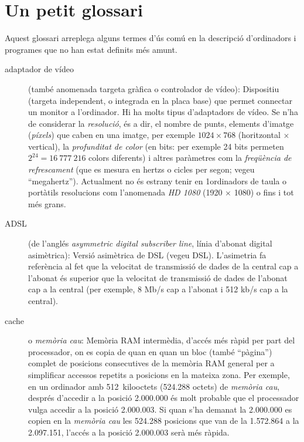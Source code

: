 \section{Un petit glossari}
\label{ss:OiPgloss}
Aquest glossari arreplega alguns termes d'ús comú en la descripció
d'ordinadors i programes que no han estat definits més amunt.

\begin{description}
\item[adaptador de vídeo] (també anomenada targeta gràfica o
  controlador de vídeo): Dispositiu (targeta independent, o integrada
  en la placa base) que permet connectar un monitor a l'ordinador. Hi
  ha molts tipus d'adaptadors de vídeo. Se n'ha de considerar la
  \emph{resolució}, és a dir, el nombre de punts, elements d'imatge
  (\emph{píxels}) que caben en una imatge, per exemple $1024 \times
  768$ (horitzontal $\times$ vertical), la \emph{profunditat de color}
  (en bits: per exemple 24 bits permeten $2^{24}=16~777~216$ colors
  diferents) i altres paràmetres com la {\em freqüència de
    refrescament} (que es mesura en hertzs o cicles per segon; vegeu
  ``megahertz''). Actualment no és estrany tenir en 1ordinadors de
  taula o portàtils resolucions com l'anomenada \emph{HD 1080} (1920
  $\times$ 1080) o fins i tot més grans.
  
\item[ADSL] (de l'anglés \emph{asymmetric digital subscriber line},
  línia d'abonat digital asimètrica): Versió asimètrica de DSL (vegeu
  DSL). L'asimetria fa referència al fet que la velocitat de
  transmissió de dades de la central cap a l'abonat és superior que la
  velocitat de transmissió de dades de l'abonat cap a la central (per
  exemple, 8 Mb/s cap a l'abonat i 512 kb/s cap a la central).

\item[cache] o \emph{memòria cau}: Memòria RAM intermèdia, d'accés més
  ràpid per part del processador, on es copia de quan en quan un bloc
  (també ``pàgina'') complet de posicions consecutives de la memòria
  RAM general per a simplificar accessos repetits a posicions en la
  mateixa zona. Per exemple, en un ordinador amb 512~kilooctets
  (524.288 octets) de \emph{memòria cau}, després d'accedir a la
  posició 2.000.000 és molt probable que el processador vulga accedir
  a la posició 2.000.003. Si quan s'ha demanat la 2.000.000 es copien
  en la \emph{memòria cau} les 524.288 posicions que van de la
  1.572.864 a la 2.097.151, l'accés a la posició 2.000.003 serà més
  ràpida.


\end{description}
